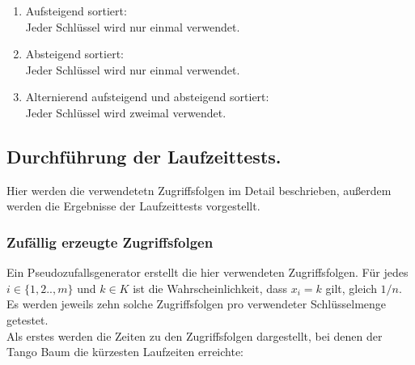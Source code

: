 \documentclass[a4paper,12pt]{article}
\begin{document}
\begin{enumerate}
  \item Aufsteigend sortiert:\\
  Jeder Schlüssel wird nur einmal verwendet.
  \item Absteigend sortiert:\\
  Jeder Schlüssel wird nur einmal verwendet.
  \item  Alternierend aufsteigend und absteigend sortiert:\\
   Jeder Schlüssel wird zweimal verwendet.
 \end{enumerate}



\subsection{Durchführung der Laufzeittests.} 
Hier werden die verwendetetn Zugriffsfolgen  im Detail beschrieben, außerdem werden die Ergebnisse der Laufzeittests vorgestellt.
\subsubsection{Zufällig erzeugte Zugriffsfolgen}
	Ein Pseudozufallsgenerator erstellt die hier verwendeten Zugriffsfolgen. Für jedes $i \in \{1,2..,m\}$ und $k \in K$ ist die Wahrscheinlichkeit, dass $x_i = k$ gilt, gleich $1 /n$. Es werden jeweils zehn solche Zugriffsfolgen pro verwendeter Schlüsselmenge getestet. \label{zufZu} \\
	Als erstes werden die Zeiten zu den Zugriffsfolgen dargestellt, bei denen der Tango Baum die kürzesten Laufzeiten erreichte:
\end{document}
